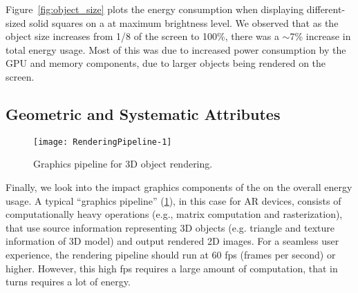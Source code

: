 Figure~\ref{fig:object_size} plots the energy consumption when displaying 
different-sized solid squares on a \mlo at maximum brightness level. We observed that as the object size increases from 1/8 of the screen to 100\%, there was a $\sim$7\% increase in total energy usage. Most of 
this was due to increased power consumption by the GPU and memory components, due to larger objects being rendered on the screen. 


%
%





\subsection{Geometric and Systematic Attributes}

\begin{figure}[t]
    \centering
    \texttt{[image: RenderingPipeline-1]}
    \vspace{-2ex}
    \caption{Graphics pipeline for 3D object rendering.}
    \label{fig:pipeline}
\end{figure}

Finally, we look into the impact graphics components of the {\mlo} on the overall energy usage. A typical ``graphics pipeline'' (\fig\ref{fig:pipeline}), in this case for AR devices, consists of computationally heavy operations (e.g., matrix computation and rasterization), that use source information representing 3D objects (e.g. triangle and texture information of 3D model) and output rendered 2D images. For a seamless user experience, the rendering pipeline should run at 60 fps (frames per second) or higher. However, this high fps requires a large amount of computation, that in turns requires a lot of energy.


